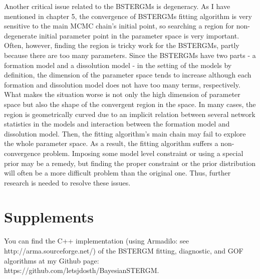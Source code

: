 \documentclass[a4paper, 11pt]{report}
\theoremstyle{definition}
\begin{document}
Another critical issue related to the BSTERGMs is degeneracy. 
As I have mentioned in chapter 5, 
the convergence of BSTERGMs fitting algorithm is very sensitive to the main MCMC chain's initial point, 
so searching a region for non-degenerate initial parameter point in the parameter space is very important. 
Often, however, finding the region is tricky work for the BSTERGMs, partly because there are too many parameters. 
Since the BSTERGMs have two parts - a formation model and a dissolution model - in the setting of the models by definition, 
the dimension of the parameter space tends to increase 
although each formation and dissolution model does not have too many terms, respectively. 
What makes the situation worse is not only the high dimension of parameter space but also the shape of the convergent region in the space. 
In many cases, the region is geometrically curved 
due to an implicit relation between several network statistics in the models and interaction between the formation model and dissolution model. 
Then, the fitting algorithm's main chain may fail to explore the whole parameter space.
As a result, the fitting algorithm suffers a non-convergence problem. 
Imposing some model level constraint or using a special prior may be a remedy, 
but finding the proper constraint or the prior distribution will often be a more difficult problem than the original one. 
Thus, further research is needed to resolve these issues.


\section{Supplements}
You can find the C++ implementation (using Armadilo: see http://arma.sourceforge.net/)
of the BSTERGM fitting, diagnostic, and GOF algorithms
at my Github page: \\
https://github.com/letsjdosth/BayesianSTERGM.










\end{document}
